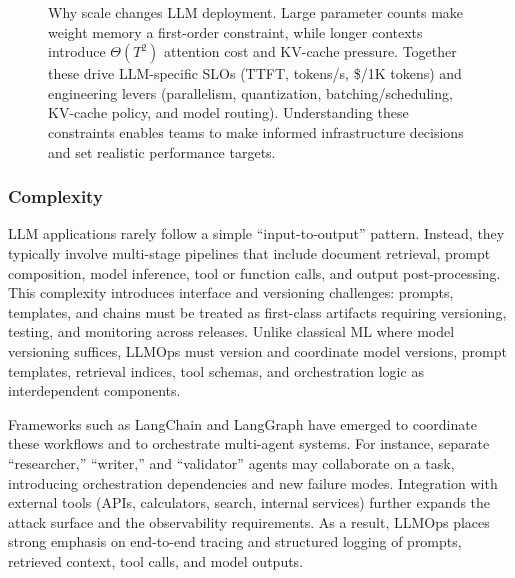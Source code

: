 \begin{figure}[t]
\begin{llmfigbox}
  \end{llmfigbox}
  \caption{Why scale changes LLM deployment. Large parameter counts make weight memory a first-order constraint,
  while longer contexts introduce $\Theta(T^2)$ attention cost and KV-cache pressure. Together these drive LLM-specific
  SLOs (TTFT, tokens/s, \$/1K tokens) and engineering levers (parallelism, quantization, batching/scheduling,
  KV-cache policy, and model routing). Understanding these constraints enables teams to make informed infrastructure
  decisions and set realistic performance targets.}
  \label{fig:ch01_scale_constraints}
\end{figure}

\subsubsection{Complexity}\label{sec:llmops-complexity}
LLM applications rarely follow a simple ``input-to-output'' pattern. Instead, they typically involve multi-stage pipelines that include document retrieval, prompt composition, model inference, tool or function calls, and output post-processing. This complexity introduces interface and versioning challenges: prompts, templates, and chains must be treated as first-class artifacts requiring versioning, testing, and monitoring across releases. Unlike classical ML where model versioning suffices, LLMOps must version and coordinate model versions, prompt templates, retrieval indices, tool schemas, and orchestration logic as interdependent components.

Frameworks such as LangChain and LangGraph have emerged to coordinate these workflows and to orchestrate multi-agent systems. For instance, separate ``researcher,'' ``writer,'' and ``validator'' agents may collaborate on a task, introducing orchestration dependencies and new failure modes. Integration with external tools (APIs, calculators, search, internal services) further expands the attack surface and the observability requirements. As a result, LLMOps places strong emphasis on end-to-end tracing and structured logging of prompts, retrieved context, tool calls, and model outputs.

